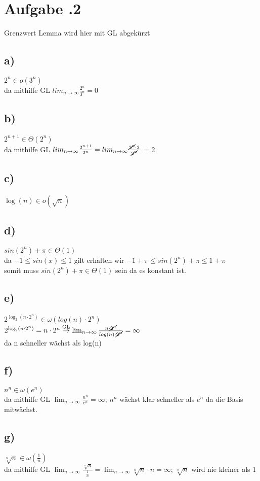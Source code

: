 \section*{Aufgabe \bn.2}
Grenzwert Lemma wird hier mit GL abgekürzt
\subsection*{a)}
	$ 2^n \in o(3^n) $ \\
	da mithilfe GL $ lim _{ n \rightarrow \infty } \frac{ 2^n }{ 3^n } = 0  $
\subsection*{b)}
	$ 2^{n+1}\in \Theta(2^n) $ \\ 
	da mithilfe GL $ lim _{ n \rightarrow \infty } \frac{ 2^{n+1} }{ 2^n } = lim _{ n \rightarrow \infty } \frac{ \cancel{2^n}\cdot 2 }{ \cancel{2^n} } $ = 2
\subsection*{c)}
	$\log(n) \in o(\sqrt{n})$
\subsection*{d)}
	$ sin(2^n)+\pi \in \Theta(1) $\\
	da $ -1 \le sin(x) \le 1 $ gilt erhalten wir $ -1 + \pi \le sin(2^n)+\pi\le 1+\pi $ \\
	somit muss $ sin(2^n)+\pi\in\Theta(1) $ sein da es konstant ist.
\subsection*{e)}
	$ 2 ^{ \log_2(n\cdot2^n) } \in\omega(log(n)\cdot2^n)$ \\
	$ 2 ^{ \log_2(n\cdot2^n) } = n\cdot 2^n \overset{\text{GL}}{\rightarrow } \lim _{ n \rightarrow \infty } \frac{ n\cdot \cancel{2^n}}{ log(n)\cdot\cancel{2^n} } = \infty $ \\
	da n schneller wächst als log(n)
\subsection*{f)}
$ n^n\in\omega(e^n) $ \\
da mithilfe GL $ \lim _{ n \rightarrow \infty } \frac{ n^n }{ e^n } =\infty $; $ n^n $ wächst klar schneller als $ e^n $ da die Basis mitwächst.
\subsection*{g)}
$ \sqrt[n]{n}\in\omega(\frac{ 1 }{ n } ) $ \\
da mithilfe GL $ \lim _{ n \rightarrow \infty } \frac{ \sqrt[n]{n} }{ \frac{ 1 }{ n }  } = \lim _{ n \rightarrow \infty } \sqrt[n]{n} \cdot n = \infty $; $ \sqrt[n]{n} $ wird nie kleiner als 1
